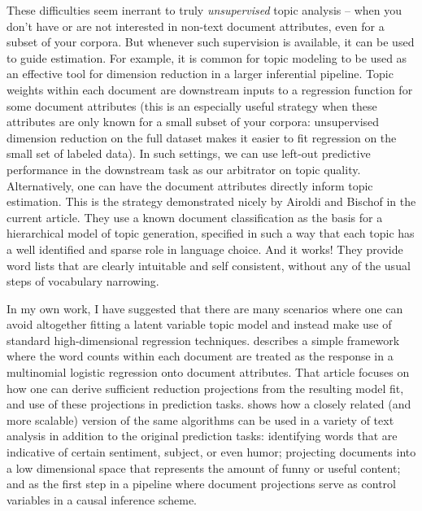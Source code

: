 \documentclass[12pt]{article}
\begin{document}
These difficulties seem inerrant to truly {\it unsupervised} topic analysis -- when you don't have or are not interested in non-text document attributes, even for a subset of your corpora.  But whenever such supervision is available, it can be used to guide estimation.  For example, it is common for topic modeling to be used as an effective tool for dimension reduction in a larger inferential pipeline.  Topic weights within each document are downstream inputs to a regression function for some document attributes (this is an especially useful strategy when these attributes are only known for a small subset of your corpora: unsupervised dimension reduction on the full dataset makes it easier to fit regression on the small set of labeled data).  In such settings, we can use left-out predictive performance in the downstream task as our arbitrator on topic quality.  Alternatively, one can have the document attributes directly inform topic estimation.  This is the strategy demonstrated nicely by Airoldi and Bischof in the current article.  They use a known document classification as the basis for a hierarchical model of topic generation, specified in such a way that each topic has a well identified and sparse role in language choice.  And it works! They provide word lists that are clearly intuitable and self consistent, without any of the usual steps of vocabulary narrowing.

In my own work, I have suggested that there are many scenarios where one can avoid altogether fitting a latent variable topic model and instead make use of standard high-dimensional regression techniques.  \cite{taddy_multinomial_2013} describes a simple framework where the word counts within each document are treated as the response in a multinomial logistic regression onto document attributes.  That article focuses on how one can derive sufficient reduction projections from the resulting model fit, and use of these projections in prediction tasks.  \cite{taddy_distributed_2015} 
shows how a closely related (and more scalable) version of the same algorithms can be used in a variety of text analysis in addition to the original prediction tasks: identifying words that are indicative of certain sentiment, subject, or even humor; projecting documents into a low dimensional space that represents the amount of funny or useful content; and as the first step in a pipeline where document projections serve as control variables in a causal inference scheme.


\small


\end{document}
